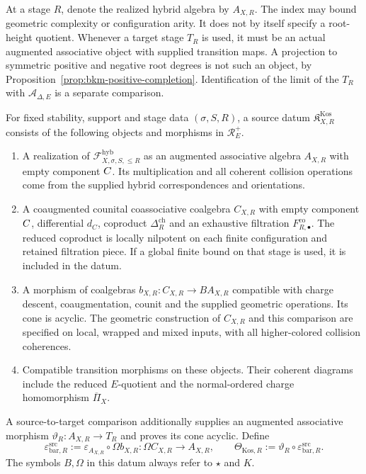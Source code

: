 At a stage $R$, denote the realized hybrid algebra by $A_{X,R}$.
The index may bound geometric complexity or configuration arity.
It does not by itself specify a root-height quotient. Whenever a
target stage $T_R$ is used, it must be an actual augmented
associative object with supplied transition maps. A projection to
symmetric positive and negative root degrees is not such an object,
by Proposition~\ref{prop:bkm-positive-completion}. Identification
of the limit of the $T_R$ with $\mathcal A_{\Delta,E}$ is a
separate comparison.

\begin{definition}
\label{def:chiral-koszul-source-datum}
For fixed stability, support and stage data $(\sigma,S,R)$, a
source datum $\mathfrak K^{\mathrm{Kos}}_{X,R}$ consists of the
following objects and morphisms in $\mathcal R_E^+$.
\begin{enumerate}
\item A realization of
$\mathcal F^{\mathrm{hyb}}_{X,\sigma,S,\leq R}$ as an augmented
associative algebra $A_{X,R}$ with empty component $C$.
Its multiplication and all coherent collision operations come from
the supplied hybrid correspondences and orientations.
\item A coaugmented counital coassociative coalgebra $C_{X,R}$
with empty component $C$, differential $d_C$, coproduct
$\Delta_R^{\mathrm{ch}}$ and an exhaustive filtration
$F^{\mathrm{co}}_{R,\bullet}$. The reduced coproduct is locally
nilpotent on each finite configuration and retained filtration
piece. If a global finite bound on that stage is used, it is included
in the datum.
\item A morphism of coalgebras
$b_{X,R}:C_{X,R}\to BA_{X,R}$ compatible with charge descent,
coaugmentation, counit and the supplied geometric operations.
Its cone is acyclic. The geometric construction of $C_{X,R}$
and this comparison are specified on local, wrapped and mixed
inputs, with all higher-colored collision coherences.
\item Compatible transition morphisms on these objects. Their
coherent diagrams include the reduced $E$-quotient and the
normal-ordered charge homomorphism $\overline\Pi_X$.
\end{enumerate}
A source-to-target comparison additionally supplies an augmented
associative morphism $\vartheta_R:A_{X,R}\to T_R$ and proves
its cone acyclic. Define
\[
 \varepsilon^{\mathrm{src}}_{\mathrm{bar},R}
 :=\varepsilon_{A_{X,R}}\circ\Omega b_{X,R}:
 \Omega C_{X,R}\longrightarrow A_{X,R},
 \qquad
 \Theta_{\mathrm{Kos},R}
 :=\vartheta_R\circ\varepsilon^{\mathrm{src}}_{\mathrm{bar},R}.
\]
The symbols $B,\Omega$ in this datum always refer to $\star$ and $K$.
\end{definition}

